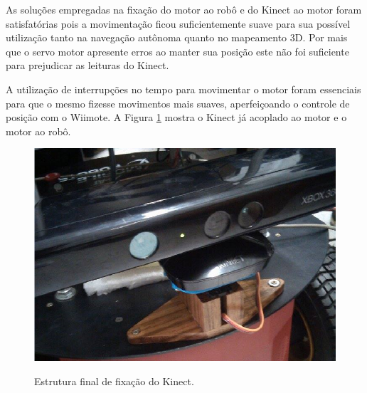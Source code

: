 As soluções empregadas na fixação do motor ao robô e do Kinect ao motor foram satisfatórias pois a movimentação ficou suficientemente suave para sua possível utilização tanto na navegação autônoma quanto no mapeamento 3D. Por mais que o servo motor apresente erros ao manter sua posição este não foi suficiente para prejudicar as leituras do Kinect.

A utilização de interrupções no tempo para movimentar o motor foram essenciais para que o mesmo fizesse movimentos mais suaves, aperfeiçoando o controle de posição com o Wiimote. A Figura \ref{fig:kinectMontado} mostra o Kinect já acoplado ao motor e o motor ao robô.

\begin{figure}[H]
\centering
  \includegraphics[scale=.35]{images/kinectMontado.png} \\
\caption{\small{Estrutura final de fixação do Kinect.}}
\label{fig:kinectMontado}
\end{figure} 
